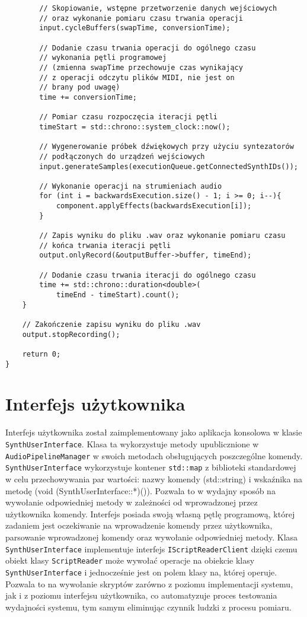 \begin{lstlisting}
        // Skopiowanie, wstępne przetworzenie danych wejściowych
        // oraz wykonanie pomiaru czasu trwania operacji
        input.cycleBuffers(swapTime, conversionTime);

        // Dodanie czasu trwania operacji do ogólnego czasu
        // wykonania pętli programowej
        // (zmienna swapTime przechowuje czas wynikający
        // z operacji odczytu plików MIDI, nie jest on
        // brany pod uwagę)
        time += conversionTime;

        // Pomiar czasu rozpoczęcia iteracji pętli
        timeStart = std::chrono::system_clock::now();

        // Wygenerowanie próbek dźwiękowych przy użyciu syntezatorów
        // podłączonych do urządzeń wejściowych
        input.generateSamples(executionQueue.getConnectedSynthIDs());

        // Wykonanie operacji na strumieniach audio
        for (int i = backwardsExecution.size() - 1; i >= 0; i--){
            component.applyEffects(backwardsExecution[i]);
        }

        // Zapis wyniku do pliku .wav oraz wykonanie pomiaru czasu
        // końca trwania iteracji pętli
        output.onlyRecord(&outputBuffer->buffer, timeEnd);

        // Dodanie czasu trwania iteracji do ogólnego czasu
        time += std::chrono::duration<double>(
            timeEnd - timeStart).count();
    }

    // Zakończenie zapisu wyniku do pliku .wav
    output.stopRecording();

    return 0;
}
\end{lstlisting}


\section{Interfejs użytkownika}
Interfejs użytkownika został zaimplementowany jako aplikacja konsolowa w klasie \texttt{SynthUserInterface}. Klasa ta wykorzystuje metody upublicznione w \texttt{AudioPipelineManager} w swoich metodach obsługujących poszczególne komendy. \texttt{SynthUserInterface} wykorzystuje kontener \texttt{std::map} z biblioteki standardowej w celu przechowywania par wartości: nazwy komendy (std::string) i wskaźnika na metodę (void (SynthUserInterface::*)()). Pozwala to w wydajny sposób na wywołanie odpowiedniej metody w zależności od wprowadzonej przez użytkownika komendy. Interfejs posiada swoją własną pętlę programową, której zadaniem jest oczekiwanie na wprowadzenie komendy przez użytkownika, parsowanie wprowadzonej komendy oraz wywołanie odpowiedniej metody. Klasa \texttt{SynthUserInterface} implementuje interfejs \texttt{IScriptReaderClient} dzięki czemu obiekt klasy \texttt{ScriptReader} może wywołać operacje na obiekcie klasy \texttt{SynthUserInterface} i jednocześnie jest on polem klasy na, której operuje. Pozwala to na wywołanie skryptów zarówno z poziomu implementacji systemu, jak i z poziomu interfejsu użytkownika, co automatyzuje proces testowania wydajności systemu, tym samym eliminując czynnik ludzki z procesu pomiaru.
